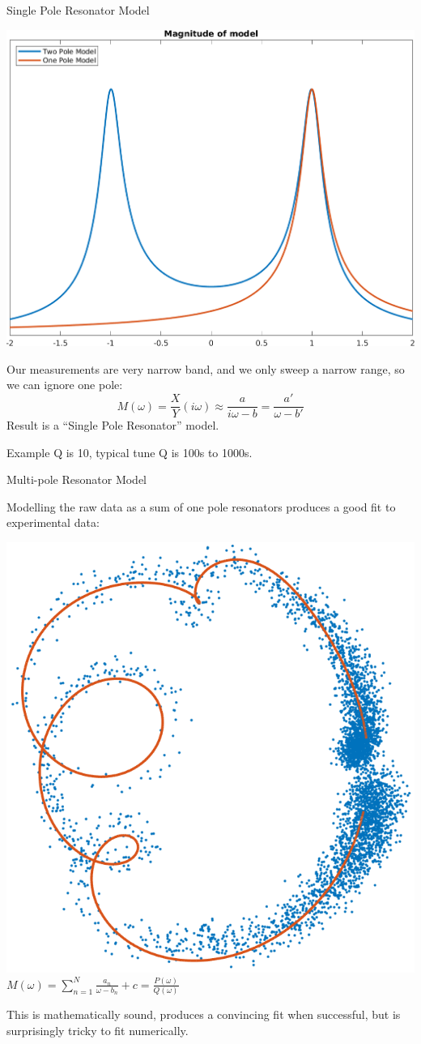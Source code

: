 \documentclass[aspectratio=169, xcolor=table]{beamer}
\begin{document}
%
\begin{frame}{Single Pole Resonator Model}

\begin{minipage}{0.45\textwidth}
\includegraphics[width=\linewidth]{one-pole-model.png}
\end{minipage}
\quad
\begin{minipage}{0.50\textwidth}
Our measurements are very narrow band, and we only sweep a narrow range, so we
can ignore one pole:
\[
    M(\omega) = \frac XY(i\omega) \approx \frac{a}{i\omega-b}
    = \frac{a'}{\omega-b'}
\]
Result is a ``Single Pole Resonator'' model.

\bigskip
\scriptsize{Example Q is 10, typical tune Q is 100s to 1000s.}
\end{minipage}

\end{frame}


%
\begin{frame}{Multi-pole Resonator Model}

Modelling the raw data as a sum of one pole resonators produces a good fit to
experimental data:

\begin{center}
\includegraphics[align=c, width=0.25\linewidth]{good-raw-fit.png}
\qquad
$\displaystyle
    M(\omega) = \sum_{n=1}^N\frac{a_n}{\omega-b_n} + c
              = \frac{P(\omega)}{Q(\omega)}
$

\end{center}

\medskip

This is mathematically sound, produces a convincing fit when successful, but is
surprisingly tricky to fit numerically.

\end{frame}
\end{document}
